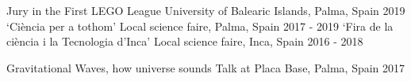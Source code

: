 \begin{cvpress}
    \cvpres
    {Jury in the First LEGO League}
    {University of Balearic Islands, Palma, Spain}
    {2019}
   \cvpres
    {`Ciència per a tothom'}
    {Local science faire, Palma, Spain}
    {2017 - 2019}
    \cvpres
    {`Fira de la ciència i la Tecnologia d’Inca'}
    {Local science faire, Inca, Spain}
    {2016 - 2018}
    
   \cvpres
    {Gravitational Waves, how universe sounds}
    {Talk at Placa Base, Palma, Spain}
    {2017}
\end{cvpress}


